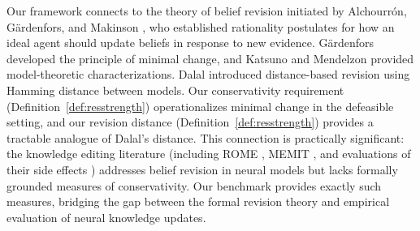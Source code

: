 \documentclass{article}
\theoremstyle{definition}
\begin{document}
Our framework connects to the theory of belief revision initiated by Alchourr\'{o}n, G\"{a}rdenfors, and Makinson \cite{alchourron1985logic}, who established rationality postulates for how an ideal agent should update beliefs in response to new evidence. G\"{a}rdenfors \cite{gardenfors1988knowledge} developed the principle of minimal change, and Katsuno and Mendelzon \cite{katsuno1991propositional} provided model-theoretic characterizations. Dalal \cite{dalal1988investigations} introduced distance-based revision using Hamming distance between models. Our conservativity requirement (Definition~\ref{def:resstrength}) operationalizes minimal change in the defeasible setting, and our revision distance (Definition~\ref{def:resstrength}) provides a tractable analogue of Dalal's distance. This connection is practically significant: the knowledge editing literature (including ROME \cite{meng2022locating}, MEMIT \cite{meng2023mass}, and evaluations of their side effects \cite{cohen2024evaluating}) addresses belief revision in neural models but lacks formally grounded measures of conservativity. Our benchmark provides exactly such measures, bridging the gap between the formal revision theory and empirical evaluation of neural knowledge updates.
\end{document}
